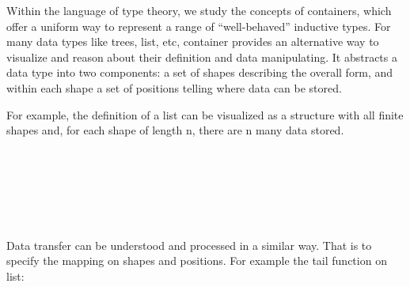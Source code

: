 Within the language of type theory, we study the concepts of containers\cite{abbott2003categories}\cite{abbott2005containers}, which offer a uniform way to represent a range of ``well-behaved'' inductive types. For many data types like trees, list, etc, container provides an alternative way to visualize and reason about their definition and data manipulating. It abstracts a data type into two components: a set of shapes describing the overall form, and within each shape a set of positions telling where data can be stored.

For example, the definition of a list can be visualized as a structure with all finite shapes and, for each shape of length n, there are n many data stored.

\begin{code}%
\>[0]\AgdaSpace{}%
\AgdaSpace{}%
\AgdaSymbol{(}\AgdaSpace{}%
\AgdaSymbol{:}\AgdaSpace{}%
\AgdaSymbol{)}\AgdaSpace{}%
\AgdaSymbol{:}\AgdaSpace{}%
\AgdaSpace{}%
\<%
\\
\>[0][@{}l@{\AgdaIndent{0}}]%
\>[2]\AgdaSpace{}%
\AgdaSymbol{:}\AgdaSpace{}%
\AgdaSpace{}%
\<%
\\
%
\>[2]\AgdaSpace{}%
\AgdaSymbol{:}\AgdaSpace{}%
\AgdaSpace{}%
\AgdaSpace{}%
\AgdaSpace{}%
\<%
\\
%
\>[2]\AgdaSpace{}%
\AgdaSymbol{:}\AgdaSpace{}%
\AgdaSpace{}%
\AgdaSpace{}%
\AgdaSpace{}%
\AgdaSpace{}%
\AgdaSpace{}%
\<%
\\
%
\>[2]\AgdaSpace{}%
\AgdaSymbol{:}\AgdaSpace{}%
\AgdaSpace{}%
\AgdaSpace{}%
\AgdaSpace{}%
\AgdaSpace{}%
\AgdaSpace{}%
\AgdaSpace{}%
\AgdaSpace{}%
\<%
\\
%
\>[2]\<%
\end{code}

Data transfer can be understood and processed in a similar way. That is to specify the mapping on shapes and positions. For example the tail function on list:

